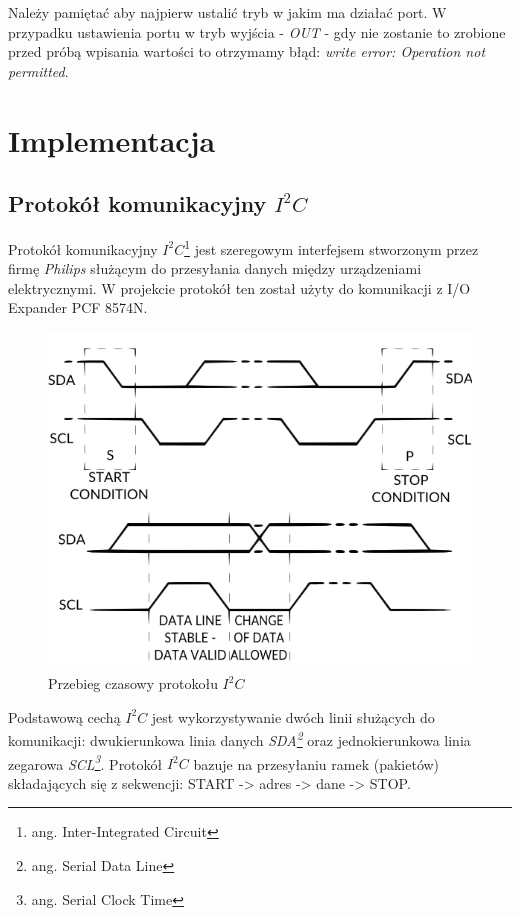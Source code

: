 \documentclass{xmgr}
\begin{document}
Należy pamiętać aby najpierw ustalić tryb w jakim ma działać port. W przypadku ustawienia portu w tryb wyjścia - \emph{OUT} - gdy nie zostanie to zrobione przed próbą wpisania wartości to otrzymamy błąd: \emph{write error: Operation not permitted}.


\chapter{Implementacja}
\section{Protokół komunikacyjny $I^2C$}
Protokół komunikacyjny \emph{$I^2C$}\footnote{ang. Inter-Integrated Circuit} jest szeregowym interfejsem stworzonym przez firmę \emph{Philips} służącym do przesyłania danych między urządzeniami elektrycznymi. W projekcie protokół ten został użyty do komunikacji z I/O Expander PCF 8574N.

\begin{figure}[!h]
    \centering
    \includegraphics[height=0.3\textheight]{images/i2c.png}
    \caption{Przebieg czasowy protokołu $I^2C$}
\end{figure}

Podstawową cechą \emph{$I^2C$} jest wykorzystywanie dwóch linii służących do komunikacji: dwukierunkowa linia danych \emph{SDA\footnote{ang. Serial Data Line}} oraz jednokierunkowa linia zegarowa \emph{SCL\footnote{ang. Serial Clock Time}}. Protokół $I^2C$ bazuje na przesyłaniu ramek (pakietów) składających się z sekwencji: START -> adres -> dane -> STOP.
\end{document}
